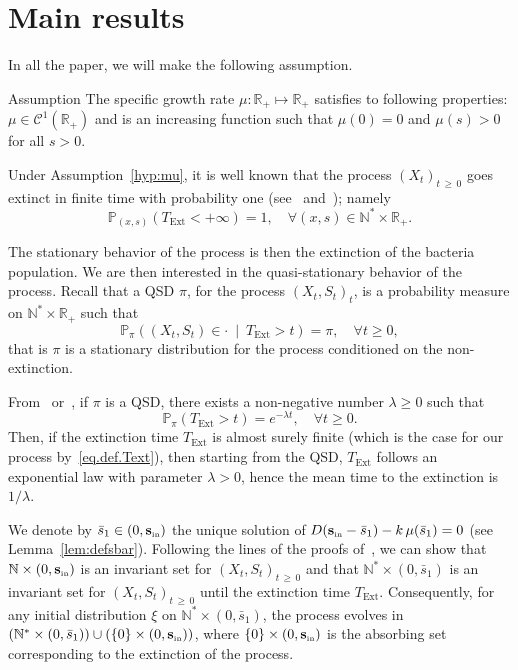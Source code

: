 \documentclass[AHL,Unicode,longabstracts,published]{cedram}
\newcommand{\PP}{\mathbb{P}}
\newcommand{\RR}{\mathbb{R}}
\newcommand{\NN}{\mathbb{N}}
\newcommand{\clC}{\mathcal{C}}
\newcommand{\Sin}{{\mathbf s}_{\textrm{\tiny\rm in}}}
\newcommand{\X}{\NN^* \times (0,\bar s_1)}
\newcommand{\Text}{T_{\mathrm{Ext}}}
\newcommand{\1}{\mathbf{1}}
\let\oldforall\forall
\renewcommand*{\forall}{\mathrel{\oldforall}}
\begin{document}
\section{Main results}\label{sec:main.result}



In all the paper, we will make the following assumption.

\begin{enonce}{Assumption}\label{hyp:mu}
The specific growth rate $\mu:\RR_+ \mapsto \RR_+$ satisfies to following properties: $\mu\in\clC^1(\RR_+)$ and is an increasing function such that $\mu(0)=0$ and $\mu(s)>0$ for all $s>0$.
\end{enonce}


Under Assumption~\ref{hyp:mu}, it is well known that the process $(X_t)_{t\,\geq\,0}$ goes extinct in finite time with probability one (see~\cite[Theorem~4 and Remark~7]{CF17} and~\cite[Theorem~3.1]{CMMS}); namely
\begin{equation}\label{eq.def.Text}
\PP_{(x,s)}\left(\Text<+\infty\right)=1, \quad \forall (x,s)\in \NN^*\times \RR_+.
\end{equation}

The stationary behavior of the process is then the extinction of the bacteria population. We are then interested in the quasi-stationary behavior of the process. Recall that a QSD $\pi$, for the process $(X_t,S_t)_t$, is a probability measure on $\NN^*\times \RR_+$ such that
\begin{equation}\label{eq:def_QSD}
\PP_\pi \left((X_t,S_t) \in \cdot \ \middle| \ \Text>t\right) = \pi, \quad \forall t \geq 0,
\end{equation}
that is $\pi$ is a stationary distribution for the process conditioned on the non-extinction.

From~\cite[Proposition~2]{MV12} or~\cite[Theorem~2.2]{CMS13}, if $\pi$ is a QSD, there exists a non-negative number $\lambda\geq 0$ such that
\begin{equation}\label{eq:lambda}
\PP_\pi\left(\Text >t\right) = e^{-\lambda t}, \quad \forall t \geq 0.
\end{equation}
Then, if the extinction time $\Text$ is almost surely finite (which is the case for our process by~\eqref{eq.def.Text}), then starting from the QSD, $\Text$ follows an exponential law with parameter $\lambda>0$, hence the mean time to the extinction is $1/\lambda$.



We denote by $\bar s_1\in(0,\Sin)$ the unique solution of $D(\Sin-\bar s_1)-k\,\mu(\bar s_1) = 0$ (see Lemma~\ref{lem:defsbar}). Following the lines of the proofs of~\cite[Proposition~2.1 and Corollary~3.1]{CMMS}, we can show that $\NN\times (0,\Sin)$ is an invariant set for $(X_t,S_t)_{t\,\geq\,0}$ and that $\NN^*\times (0,\bar s_1)$ is an invariant set for $(X_t,S_t)_{t\,\geq\,0}$ until the extinction time $\Text$. Consequently, for any initial distribution $\xi$ on $\NN^*\times (0, \bar s_1)$, the process evolves in $(\X)\cup (\{0\}\times (0,\Sin))$, where $\{0\}\times (0,\Sin)$ is the absorbing set corresponding to the extinction of the process.
\end{document}
